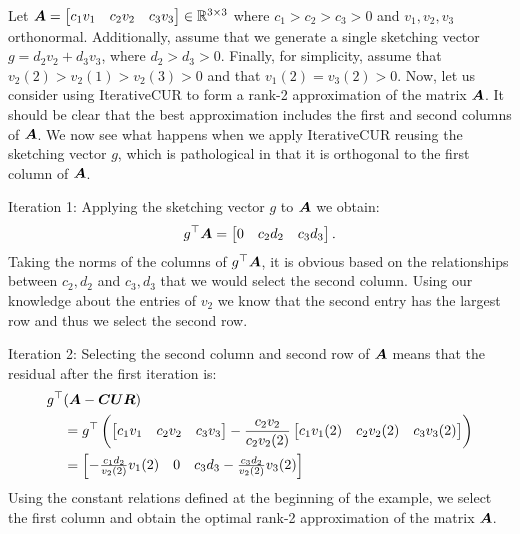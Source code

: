 \begin{example}
    Let $\boldsymbol{A} = \begin{bmatrix}
        c_1 v_1 & c_2 v_2 & c_3 v_3
    \end{bmatrix} \in \mathbb{R}^{3\times 3}$ where $c_1 > c_2> c_3 > 0$ and $v_1,v_2,v_3$ orthonormal. Additionally, assume that we generate a single sketching vector $g = d_2 v_2 + d_3 v_3$, where $d_2 > d_3 >0$. Finally, for simplicity, assume that $v_2(2) > v_2(1) >v_2(3) >0$ and that $v_1(2) = v_3(2) > 0$. Now, let us consider using IterativeCUR to form a rank-2 approximation of the matrix $\boldsymbol{A}$. It should be clear that the best approximation includes the first and second columns of $\boldsymbol{A}$. We now see what happens when we apply IterativeCUR reusing the sketching vector $g$, which is pathological in that it is orthogonal to the first column of $\boldsymbol{A}$.
    \vspace{1em}

    Iteration 1: Applying the sketching vector $g$ to $\boldsymbol{A}$ we obtain:
    \begin{equation}
        g^\top \boldsymbol{A} = \begin{bmatrix}
            0 & c_2 d_2 & c_3 d_3
        \end{bmatrix}.
    \end{equation}
    Taking the norms of the columns of $g^\top \boldsymbol{A}$, it is obvious based on the relationships between $c_2,d_2$ and $c_3, d_3$ that we would select the second column. Using our knowledge about the entries of $v_2$ we know that the second entry has the largest row and thus we select the second row. 
    \vspace{1em}

    Iteration 2:
    Selecting the second column and second row of $\boldsymbol{A}$ means that the residual after the first iteration is:
    \begin{align}
        g^\top & (\boldsymbol{A} - \boldsymbol{C} \boldsymbol{U} \boldsymbol{R}) \\
        &= g^\top \left(\begin{bmatrix}
        c_1 v_1 & c_2 v_2 & c_3 v_3
        \end{bmatrix} - \frac{c_2 v_2}{c_2 v_2(2)}  \begin{bmatrix}
            c_1v_1(2) & c_2v_2(2) & c_3v_3(2)
        \end{bmatrix}\right)\\
        &=\begin{bmatrix}
            -\frac{c_1 d_2}{v_2(2)} v_1(2) & 0& c_3 d_3 - \frac{c_3 d_2}{v_2(2)} v_3(2)
        \end{bmatrix}
    \end{align}
    Using the constant relations defined at the beginning of the example, we select the first column and obtain the optimal rank-2 approximation of the matrix $\boldsymbol{A}$. 
\end{example}


